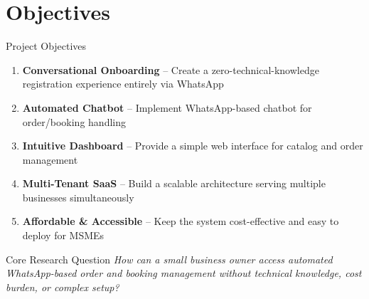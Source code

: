 \documentclass[aspectratio=169]{beamer}
\begin{document}
\section{Objectives}
\begin{frame}{Project Objectives}

\begin{enumerate}
  \item \textbf{Conversational Onboarding} -- Create a zero-technical-knowledge registration experience entirely via WhatsApp
  \item \textbf{Automated Chatbot} -- Implement WhatsApp-based chatbot for order/booking handling
  \item \textbf{Intuitive Dashboard} -- Provide a simple web interface for catalog and order management
  \item \textbf{Multi-Tenant SaaS} -- Build a scalable architecture serving multiple businesses simultaneously
  \item \textbf{Affordable \& Accessible} -- Keep the system cost-effective and easy to deploy for MSMEs
\end{enumerate}

\begin{block}{Core Research Question}
\textit{How can a small business owner access automated WhatsApp-based order and booking management without technical knowledge, cost burden, or complex setup?}
\end{block}

\end{frame}

\end{document}
